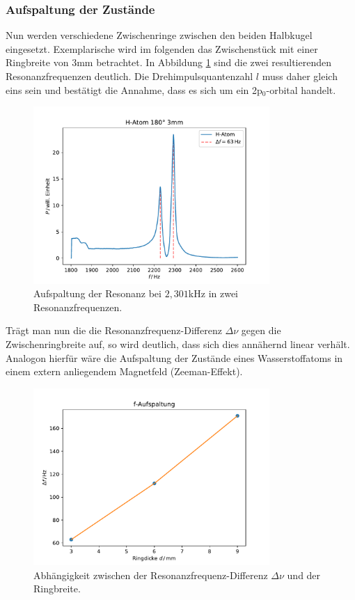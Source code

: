 \subsubsection*{Aufspaltung der Zustände}
Nun werden verschiedene Zwischenringe zwischen den beiden Halbkugel eingesetzt. Exemplarische wird im folgenden das Zwischenstück
mit einer Ringbreite von $3$mm betrachtet. In Abbildung \ref{fig:aufspaltung} sind die zwei resultierenden Resonanzfrequenzen
deutlich. Die Drehimpulsquantenzahl $l$ muss daher gleich eins sein und bestätigt die Annahme, dass es sich um ein 2p$_0$-orbital handelt.  

\begin{figure}[H]
    \center
    \includegraphics[width=0.8\textwidth]{plots/Hatom/zustandsaufspaltung.pdf}
    \caption{Aufspaltung der Resonanz bei $2,301$kHz in zwei Resonanzfrequenzen.}
    \label{fig:aufspaltung}
\end{figure}

Trägt man nun die die Resonanzfrequenz-Differenz $\Delta\nu$ gegen die Zwischenringbreite auf,
so wird deutlich, dass sich dies annähernd linear verhält. Analogon hierfür wäre die Aufspaltung der Zustände eines
Wasserstoffatoms in einem extern anliegendem Magnetfeld (Zeeman-Effekt).

\begin{figure}[H]
    \center
    \includegraphics[width=0.8\textwidth]{plots/Hatom/faufspaltung.pdf}
    \caption{Abhängigkeit zwischen der Resonanzfrequenz-Differenz $\Delta\nu$ und der Ringbreite.}
    \label{fig:d_res}
\end{figure}

